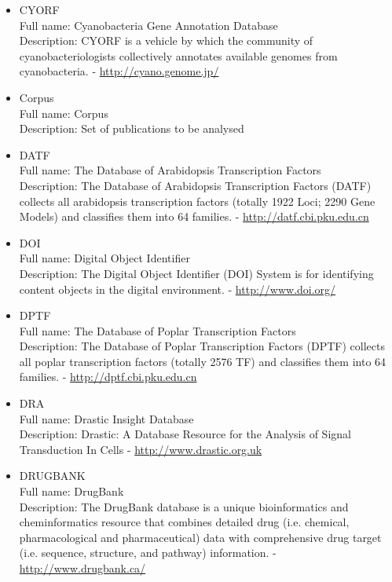 \begin{itemize}
\item{CYORF}\\ Full name: Cyanobacteria Gene Annotation Database\\ Description: CYORF is a vehicle by which the community of cyanobacteriologists collectively annotates available genomes from cyanobacteria. - 
\url{http://cyano.genome.jp/}

\item{Corpus}\\ Full name: Corpus\\ Description: Set of publications to be analysed 

\item{DATF}\\ Full name: The Database of Arabidopsis Transcription Factors\\ Description: The Database of Arabidopsis Transcription Factors (DATF) collects all arabidopsis transcription factors (totally 1922 Loci; 2290 Gene Models) and classifies them into 64 families. - 
\url{http://datf.cbi.pku.edu.cn}

\item{DOI}\\ Full name: Digital Object Identifier\\ Description: The Digital Object Identifier (DOI) System is for identifying content objects in the digital environment. - 
\url{http://www.doi.org/}

\item{DPTF}\\ Full name: The Database of Poplar Transcription Factors\\ Description: The Database of Poplar Transcription Factors (DPTF) collects all poplar transcription factors (totally 2576 TF) and classifies them into 64 families. - 
\url{http://dptf.cbi.pku.edu.cn}

\item{DRA}\\ Full name: Drastic Insight Database\\ Description: Drastic: A Database Resource for the Analysis of Signal Transduction In Cells - 
\url{http://www.drastic.org.uk}

\item{DRUGBANK}\\ Full name: DrugBank\\ Description: The DrugBank database is a unique bioinformatics and cheminformatics resource that combines detailed drug (i.e. chemical, pharmacological and pharmaceutical) data with comprehensive drug target (i.e. sequence, structure, and pathway) information. - 
\url{http://www.drugbank.ca/}


\end{itemize}
